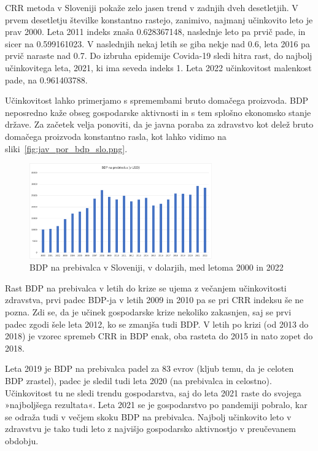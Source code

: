 \documentclass[12pt,a4paper]{article}
\theoremstyle{definition}
\begin{document}
  CRR metoda v Sloveniji pokaže zelo jasen trend v zadnjih dveh desetletjih. 
  V prvem desetletju številke konstantno rastejo, zanimivo, najmanj učinkovito leto je prav 2000. 
  Leta 2011 indeks znaša 0.628367148, naslednje leto pa prvič pade, in sicer na 0.599161023.  
  V naslednjih nekaj letih se giba nekje nad 0.6, leta 2016 pa prvič naraste nad 0.7. 
  Do izbruha epidemije Covida-19 sledi hitra rast, do najbolj učinkovitega leta, 2021, ki ima seveda indeks 1. 
  Leta 2022 učinkovitost malenkost pade, na 0.961403788.

  Učinkovitost lahko primerjamo s spremembami bruto domačega proizvoda. 
  BDP neposredno kaže obseg gospodarske aktivnosti in s tem splošno ekonomsko stanje države. 
  Za začetek velja ponoviti, da je javna poraba za zdravstvo kot delež bruto domačega proizvoda konstantno rasla, kot lahko vidimo na sliki~\ref{fig:jav_por_bdp_slo.png}. %

\begin{figure}[H]
    \centering
    \includegraphics[width=0.7\textwidth]{bnp_pbr_slo.png}
    \caption{BDP na prebivalca v Sloveniji, v dolarjih, med letoma 2000 in 2022}
    \label{fig:bnp_pbr_slo.png}
\end{figure}

Rast BDP na prebivalca v letih do krize se ujema z večanjem učinkovitosti zdravstva, prvi padec BDP-ja v letih 2009 in 2010 pa se pri CRR indeksu še ne pozna. 
Zdi se, da je učinek gospodarske krize nekoliko zakasnjen, saj se prvi padec zgodi šele leta 2012, ko se zmanjša tudi BDP. 
V letih po krizi (od 2013 do 2018) je vzorec spremeb CRR in BDP enak, oba rasteta do 2015 in nato zopet do 2018. 

Leta 2019 je BDP na prebivalca padel za 83 evrov (kljub temu, da je celoten BDP zrastel), padec je sledil tudi leta 2020 (na prebivalca in celostno). 
Učinkovitost tu ne sledi trendu gospodarstva, saj do leta 2021 raste do svojega »najboljšega rezultata«. 
Leta 2021 se je gospodarstvo po pandemiji pobralo, kar se odraža tudi v večjem skoku BDP na prebivalca. 
Najbolj učinkovito leto v zdravstvu je tako tudi leto z najvišjo gospodarsko aktivnostjo v preučevanem obdobju.
\end{document}
